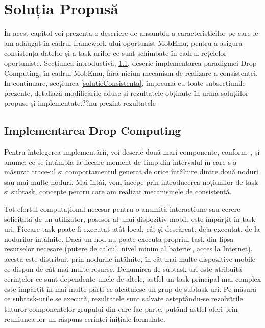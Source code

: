 \documentclass[12pt,a4paper]{report}
\begin{document}
\chapter{Soluția Propusă} \label{solutiaPropusa}

În acest capitol voi prezenta o descriere de ansamblu a caracteristicilor pe care le-am adăugat în cadrul framework-ului oportunist MobEmu, pentru a asigura consistența datelor și a task-urilor ce sunt schimbate în cadrul rețelelor oportuniste. 
Secțiunea introductivă, \ref{dropcomputing}, descrie implementarea paradigmei Drop Computing, în cadrul MobEmu, fără niciun mecanism de realizare a consistenței. In continuare, secțiunea \ref{solutieConsistenta}, împreună cu toate subsecțiunile prezente, detaliază modificările aduse și rezultatele obținute în urma soluțiilor propuse și implementate.??nu prezint rezultatele

\section{Implementarea Drop Computing} \label{dropcomputing}
Pentru întelegerea implementării, voi descrie două mari componente, conform~\cite{MobEmuArticle},  și anume: ce se întâmplă la fiecare moment de timp din intervalul în care s-a măsurat trace-ul și comportamentul generat de orice întâlnire dintre două noduri sau mai multe noduri. Mai întâi, vom începe prin introducerea noțiunilor de task și subtask, concepte pentru care am realizat mecanismele de consistență.

Tot efortul computațional necesar pentru o anumită interacțiune sau cerere solicitată de un utilizator, posesor al unui dispozitiv mobil, este împărțit în task-uri. Fiecare task poate fi executat atât local, cât și descărcat, deja executat, de la nodurilor întâlnite. Dacă un nod nu poate executa propriul task din lipsa resurselor necesare (putere de calcul, nivel minim al bateriei, acces la Internet), acesta este distribuit prin nodurile întâlnite, în cât mai multe dispozitive mobile ce dispun de cât mai multe resurse. Denumirea de subtask-uri este atribuită cerințelor ce sunt dependente unele de altele, astfel un task principal mai complex este împărțit în mai multe părți ce alcătuiesc un grup de subtask-uri. Pe măsură ce subtask-urile se execută, rezultatele sunt salvate așteptându-se rezolvările tuturor componentelor grupului din care fac parte, putând astfel oferi prin reuniunea lor un răspuns cerinței inițiale formulate. 
\end{document}
